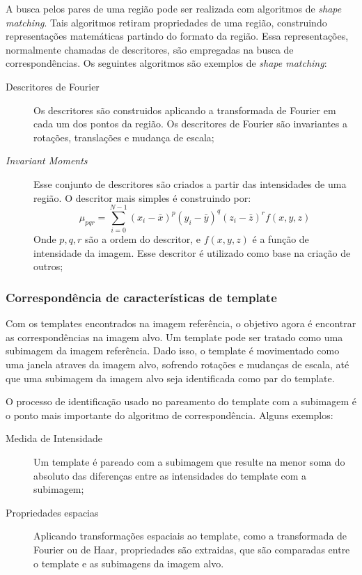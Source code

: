   A busca pelos pares de uma região pode ser realizada com algoritmos de
\textit{shape matching}. Tais algoritmos retiram propriedades de uma região,
construindo representações matemáticas partindo do formato da região. Essa
representações, normalmente chamadas de descritores, são empregadas na busca
de correspondências. Os seguintes algoritmos são exemplos de \textit{shape matching}:

\begin{description}
    \item [Descritores de Fourier] Os descritores são construidos aplicando a
          transformada de Fourier em cada um dos pontos da região. Os descritores
          de Fourier são invariantes a rotações, translações e mudança de escala;
    \item [\textit{Invariant Moments}] Esse conjunto de descritores são criados
          a partir das intensidades de uma região. O descritor mais simples é construindo
          por:
          \begin{equation}
            \mu_{pqr} = \sum_{i=0}^{N-1} (x_i - \bar{x})^p(y_i - \bar{y})^q(z_i - \bar{z})^rf(x, y, z)
          \end{equation}
          Onde $p, q, r$ são a ordem do descritor, e $f(x, y, z)$ é a função de intensidade da imagem.
          Esse descritor é utilizado como base na criação de outros;
\end{description}

\subsubsection{Correspondência de características de template}

  Com os templates encontrados na imagem referência, o objetivo agora é encontrar
as correspondências na imagem alvo. Um template pode ser tratado como uma subimagem
da imagem referência. Dado isso, o template é movimentado como uma janela
atraves da imagem alvo, sofrendo rotações e mudanças de escala, até que uma
subimagem da imagem alvo seja identificada como par do template.

  O processo de identificação usado no pareamento do template com a subimagem é
o ponto mais importante do algoritmo de correspondência. Alguns exemplos:

\begin{description}
    \item [Medida de Intensidade] Um template é pareado com a subimagem que resulte
          na menor soma do absoluto das diferenças entre as intensidades
          do template com a subimagem;
    \item [Propriedades espacias] Aplicando transformações espaciais ao template,
          como a transformada de Fourier ou de Haar, propriedades são extraidas,
          que são comparadas entre o template e as subimagens da imagem alvo.
\end{description}

